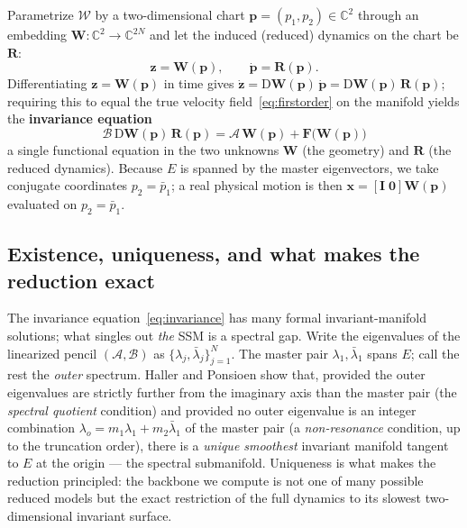 \documentclass[11pt]{article}
\newcommand{\C}{\mathbb{C}}
\begin{document}
Parametrize $\mathcal W$ by a two-dimensional chart $\bm p=(p_1,p_2)\in\C^2$
through an embedding $\bm W:\C^2\!\to\C^{2N}$ and let the induced (reduced)
dynamics on the chart be $\bm R$:
\begin{equation}
\bm z=\bm W(\bm p),\qquad \dot{\bm p}=\bm R(\bm p).
\label{eq:param}
\end{equation}
Differentiating $\bm z=\bm W(\bm p)$ in time gives
$\dot{\bm z}=\mathrm D\bm W(\bm p)\,\dot{\bm p}=\mathrm D\bm W(\bm p)\,\bm R(\bm p)$;
requiring this to equal the true velocity field~\eqref{eq:firstorder} on the
manifold yields the \textbf{invariance equation}
\begin{equation}
\boxed{\;
\bm{\mathcal B}\,\mathrm D\bm W(\bm p)\,\bm R(\bm p)
=\bm{\mathcal A}\,\bm W(\bm p)+\bm F\!\big(\bm W(\bm p)\big)
\;}
\label{eq:invariance}
\end{equation}
a single functional equation in the two unknowns $\bm W$ (the geometry) and
$\bm R$ (the reduced dynamics). Because $E$ is spanned by the master
eigenvectors, we take conjugate coordinates $p_2=\bar p_1$; a real physical
motion is then $\bm x=[\bm I\;\bm0]\bm W(\bm p)$ evaluated on $p_2=\bar p_1$.

\subsection{Existence, uniqueness, and what makes the reduction exact}
The invariance equation~\eqref{eq:invariance} has many formal invariant-manifold
solutions; what singles out \emph{the} SSM is a spectral gap. Write the eigenvalues
of the linearized pencil $(\bm{\mathcal A},\bm{\mathcal B})$ as
$\{\lambda_j,\bar\lambda_j\}_{j=1}^{N}$. The master pair $\lambda_1,\bar\lambda_1$ spans
$E$; call the rest the \emph{outer} spectrum. Haller and Ponsioen \cite{haller2016}
show that, provided the outer eigenvalues are strictly further from the imaginary axis
than the master pair (the \emph{spectral quotient} condition) and provided no outer
eigenvalue is an integer combination $\lambda_o=m_1\lambda_1+m_2\bar\lambda_1$ of the
master pair (a \emph{non-resonance} condition, up to the truncation order), there is a
\emph{unique smoothest} invariant manifold tangent to $E$ at the origin --- the
spectral submanifold. Uniqueness is what makes the reduction principled: the backbone
we compute is not one of many possible reduced models but the exact restriction of the
full dynamics to its slowest two-dimensional invariant surface.
\end{document}
